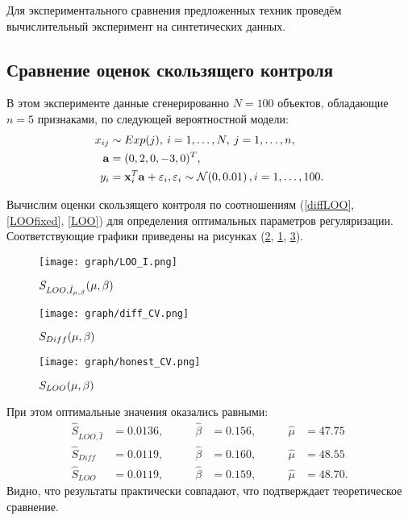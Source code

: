 Для экспериментального сравнения предложенных техник проведём вычислительный эксперимент на синтетических данных.

\subsection{Сравнение оценок скользящего контроля} %
В этом эксперименте данные сгенерированно $N=100$ объектов, обладающие $n=5$ признаками, по следующей вероятностной модели:
	\begin{align*}
		x_{ij} &\sim Exp(j), \: i=1,\ldots,N, \: j=1,\ldots,n,\\
		\boldsymbol{\mathbf{a}} &= (0, 2, 0, -3, 0)^T, \\
		y_{i} &= \boldsymbol{\mathbf{x}}_i^T \boldsymbol{\mathbf{a}} + {\varepsilon}_i, {\varepsilon}_i \sim \mathcal{N}\!\left(0,0{.}01\right), i=1,\ldots,100. 
	\end{align*}

Вычислим оценки скользящего контроля по соотношениям (\ref{diffLOO}, \ref{LOOfixed}, \ref{LOO}) для определения оптимальных параметров регуляризации. Соответствующие графики приведены на рисунках (\ref{pic:diffLOO}, \ref{pic:LOOfixed}, \ref{pic:LOO}).

\begin{figure}[H]
	\centering
	\texttt{[image: graph/LOO\_I.png]}
	\caption{$S_{LOO, \hat I_{\mu,\beta}}({\mu,\beta})$}
	\label{pic:LOOfixed}
\end{figure}

\begin{figure}[H]
	\centering
	\texttt{[image: graph/diff\_CV.png]}
	\caption{$S_{Diff}({\mu,\beta})$}
	\label{pic:diffLOO}
\end{figure}

\begin{figure}[H]
	\centering
	\texttt{[image: graph/honest\_CV.png]}
	\caption{$S_{LOO}({\mu,\beta})$}
	\label{pic:LOO}
\end{figure}

При этом оптимальные значения оказались равными:
\begin{align*}
	\hat S_{LOO, \hat I} 	&=0.0136, &\qquad	\hat \beta&=0.156, &\qquad	\hat \mu&=47.75 \\
	\hat S_{Diff} 			&=0.0119, &\qquad	\hat \beta&=0.160, &\qquad	\hat \mu&=48.55 \\
	\hat S_{LOO} 			&=0.0119, &\qquad	\hat \beta&=0.159, &\qquad	\hat \mu&=48.70.
\end{align*}
Видно, что результаты практически совпадают, что подтверждает теоретическое сравнение.

